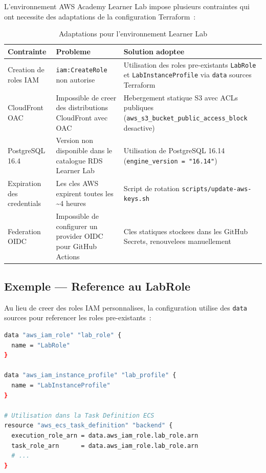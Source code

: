L'environnement AWS Academy Learner Lab impose plusieurs contraintes qui ont
necessite des adaptations de la configuration Terraform~:

\begin{table}[H]
    \centering
    \begin{tabularx}{\textwidth}{lXX}
        \toprule
        \textbf{Contrainte} & \textbf{Probleme} & \textbf{Solution adoptee} \\
        \midrule
        Creation de roles IAM & \texttt{iam:CreateRole} non autorise & Utilisation des roles
            pre-existants \texttt{LabRole} et \texttt{LabInstanceProfile} via
            \texttt{data} sources Terraform \\
        CloudFront OAC & Impossible de creer des distributions CloudFront
            avec OAC & Hebergement statique S3 avec ACLs publiques
            (\texttt{aws\_s3\_bucket\_public\_access\_block} desactive) \\
        PostgreSQL 16.4 & Version non disponible dans le catalogue RDS
            Learner Lab & Utilisation de PostgreSQL 16.14
            (\texttt{engine\_version = "16.14"}) \\
        Expiration des credentials & Les cles AWS expirent toutes les \~{}4 heures &
            Script de rotation \texttt{scripts/update-aws-keys.sh} \\
        Federation OIDC & Impossible de configurer un provider OIDC pour
            GitHub Actions & Cles statiques stockees dans les GitHub Secrets,
            renouvelees manuellement \\
        \bottomrule
    \end{tabularx}
    \caption{Adaptations pour l'environnement Learner Lab}
\end{table}

\subsection{Exemple --- Reference au LabRole}

Au lieu de creer des roles IAM personnalises, la configuration utilise
des \texttt{data} sources pour referencer les roles pre-existants~:

\begin{lstlisting}[language=bash,caption={Reference au LabRole dans Terraform}]
data "aws_iam_role" "lab_role" {
  name = "LabRole"
}

data "aws_iam_instance_profile" "lab_profile" {
  name = "LabInstanceProfile"
}

# Utilisation dans la Task Definition ECS
resource "aws_ecs_task_definition" "backend" {
  execution_role_arn = data.aws_iam_role.lab_role.arn
  task_role_arn      = data.aws_iam_role.lab_role.arn
  # ...
}
\end{lstlisting}

